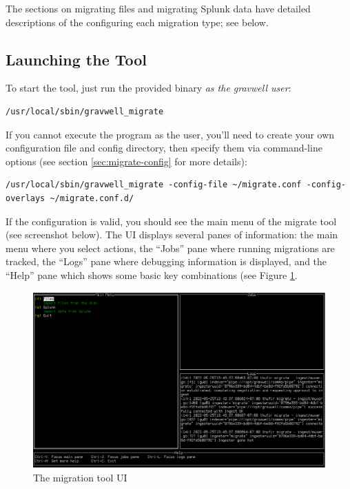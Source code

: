 The sections on migrating files and migrating Splunk data have detailed descriptions of the configuring each migration type; see below.

\subsection{Launching the Tool}

To start the tool, just run the provided binary \emph{as the gravwell user}:

\begin{verbatim}
/usr/local/sbin/gravwell_migrate
\end{verbatim}

If you cannot execute the program as the  user, you'll need to create your own configuration file and config directory, then specify them via command-line options (see section \ref{sec:migrate-config} for more details):

\begin{verbatim}
/usr/local/sbin/gravwell_migrate -config-file ~/migrate.conf -config-overlays ~/migrate.conf.d/
\end{verbatim}

If the configuration is valid, you should see the main menu of the migrate tool (see screenshot below). The UI displays several panes of information: the main menu where you select actions, the ``Jobs'' pane where running migrations are tracked, the ``Logs'' pane where debugging information is displayed, and the ``Help'' pane which shows some basic key combinations (see Figure \ref{fig:migrate-ui}.

\begin{figure}
	\includegraphics[width=0.95\linewidth]{images/migrate-ui.png}
	\caption{The migration tool UI}
	\label{fig:migrate-ui}
\end{figure}

